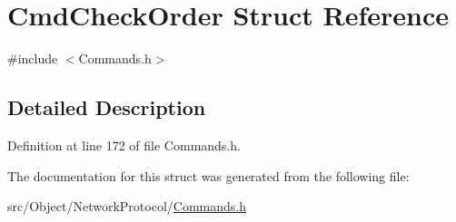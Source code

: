 \hypertarget{struct_cmd_check_order}{
\section{CmdCheckOrder Struct Reference}
\label{struct_cmd_check_order}
}


{\ttfamily \#include $<$Commands.h$>$}



\subsection{Detailed Description}


Definition at line 172 of file Commands.h.



The documentation for this struct was generated from the following file:\begin{DoxyCompactItemize}
\item 
src/Object/NetworkProtocol/\hyperlink{_commands_8h}{Commands.h}\end{DoxyCompactItemize}
